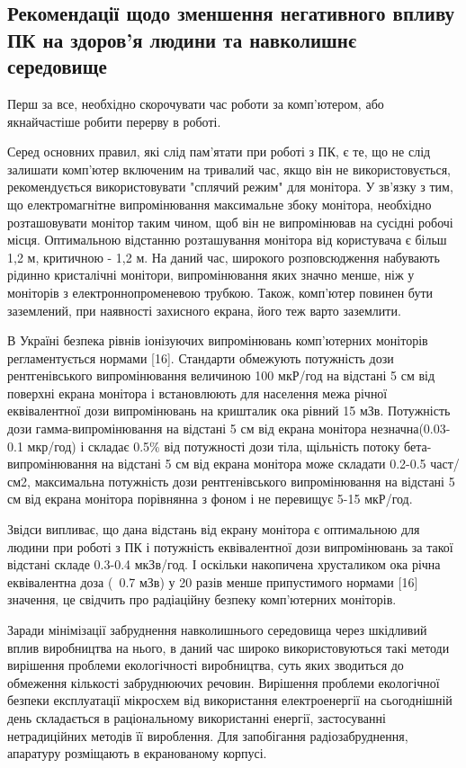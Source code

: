 \subsection{Рекомендації щодо зменшення негативного впливу ПК на здоров'я
 людини та навколишнє середовище}

Перш за все, необхідно    скорочувати   час    роботи   за   комп'ютером, або якнайчастіше робити перерву в роботі. 

Серед основних правил, які слід пам’ятати при роботі з ПК, є те, що не слід залишати комп'ютер включеним на 
тривалий час, якщо він не використовується, рекомендується використовувати "сплячий режим"     для     монітора.     
У зв'язку з тим, що електромагнітне випромінювання максимальне збоку монітора,   необхідно розташовувати монітор 
таким чином, щоб він не випромінював на сусідні робочі місця. Оптимальною відстанню розташування монітора від 
користувача є більш 1,2 м, критичною - 1,2 м. На даний час, широкого розповсюдження набувають рідинно кристалічні 
монітори, випромінювання яких значно	менше,	ніж у моніторів з    електроннопроменевою трубкою. Також, комп'ютер 
повинен бути заземлений, при наявності захисного екрана, його теж варто заземлити.

В Україні безпека рівнів іонізуючих випромінювань комп'ютерних моніторів регламентується нормами [16]. Стандарти 
обмежують потужність дози рентгенівського випромінювання величиною 100 мкР/год на відстані 5 см від поверхні екрана 
монітора і встановлюють для населення межа річної еквівалентної дози випромінювань на кришталик ока рівний 15 мЗв. 
Потужність дози гамма-випромінювання на відстані 5 см від екрана монітора незначна(0.03-0.1 мкр/год) і складає 0.5\% 
від потужності дози тіла, щільність потоку бета-випромінювання на відстані 5 см від екрана монітора може складати 0.2-0.5 
част/см2, максимальна потужність дози рентгенівського випромінювання на відстані 5 см від екрана монітора порівнянна з фоном 
і не перевищує 5-15 мкР/год. 

Звідси випливає, що дана відстань від екрану монітора є оптимальною для людини при роботі з ПК і потужність 
еквівалентної дози випромінювань за такої відстані складе 0.3-0.4 мкЗв/год. І оскільки накопичена хрусталиком 
ока річна еквівалентна доза (~0.7 мЗв) у 20 разів менше припустимого нормами [16] значення, це свідчить про 
радіаційну безпеку комп'ютерних моніторів.

Заради мінімізації забруднення навколишнього середовища через шкідливий вплив виробництва на нього, 
в даний час широко використовуються такі методи вирішення проблеми екологічності виробництва, 
суть яких зводиться до обмеження кількості забруднюючих речовин. Вирішення проблеми екологічної 
безпеки експлуатації мікросхем від використання електроенергії на сьогоднішній день складається в 
раціональному використанні енергії, застосуванні нетрадиційних методів її вироблення. Для запобігання 
радіозабруднення, апаратуру розміщають в екранованому корпусі.

% 


